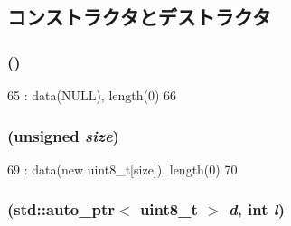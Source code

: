 \subsection{コンストラクタとデストラクタ}
\hypertarget{classEthPacketData_a5b5e616c7286e5e5ef54307815246475}{
\subsubsection[{EthPacketData}]{ ()}}
\label{classEthPacketData_a5b5e616c7286e5e5ef54307815246475}



\begin{DoxyCode}
65         : data(NULL), length(0)
66     { }
\end{DoxyCode}
\hypertarget{classEthPacketData_ac88f28d8c09dbe55bedbe2c4082234be}{
\subsubsection[{EthPacketData}]{ (unsigned {\em size})}}
\label{classEthPacketData_ac88f28d8c09dbe55bedbe2c4082234be}



\begin{DoxyCode}
69         : data(new uint8_t[size]), length(0)
70     { }
\end{DoxyCode}
\hypertarget{classEthPacketData_a0410e0f8c3bb79bfc5dadb18e0ee6b4c}{
\subsubsection[{EthPacketData}]{ (std::auto\_\-ptr$<$ uint8\_\-t $>$ {\em d}, \/  int {\em l})}}
\label{classEthPacketData_a0410e0f8c3bb79bfc5dadb18e0ee6b4c}



